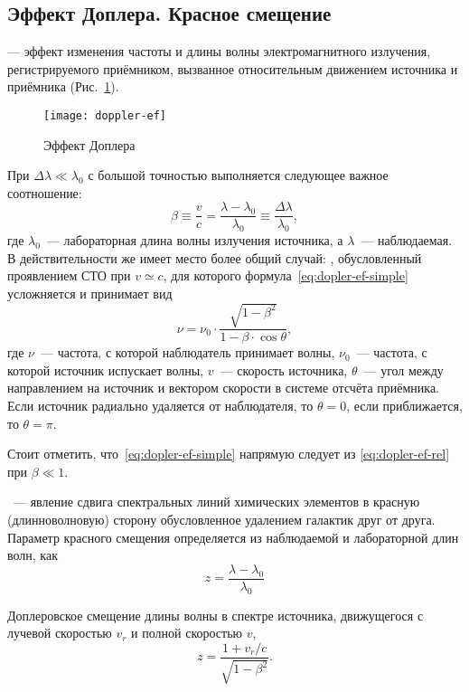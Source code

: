 \subsection{Эффект Доплера. Красное смещение} 
 --- эффект изменения частоты и длины волны электромагнитного излучения, регистрируемого приёмником, вызванное относительным движением источника и приёмника (Рис.~\ref{doppler-ef}).

\begin{figure}[h!]
	\centering
	\texttt{[image: doppler-ef]}
	\caption{Эффект Доплера}
	\label{doppler-ef}
\end{figure}

При $\Delta \lambda \ll \lambda_0$ с большой точностью выполняется следующее важное соотношение:\begin{equation}
	\beta \equiv \dfrac{v}{c} = \dfrac{\lambda - \lambda_0}{\lambda_0} \equiv \dfrac{\Delta \lambda}{\lambda_0},
	\label{eq:dopler-ef-simple}
\end{equation}
где $\lambda_0$~--- лабораторная длина волны излучения источника, а $\lambda$~--- наблюдаемая. 
В действительности же имеет место более общий случай: , обусловленный проявлением СТО при $v \simeq c$, для которого формула~\eqref{eq:dopler-ef-simple} усложняется и принимает вид \begin{equation}
	\nu = \nu_0 \cdot \dfrac{\sqrt{1 - \beta^2}}{1 - \beta \cdot \cos\theta},
	\label{eq:dopler-ef-rel}
\end{equation}
где $\nu$~--- частота, с которой наблюдатель принимает волны, $\nu_0$~--- частота, с которой источник испускает волны, $v$~--- скорость источника, $\theta$~--- угол между направлением на источник и вектором скорости в системе отсчёта приёмника. Если источник радиально удаляется от наблюдателя, то $\theta = 0$, если приближается, то $\theta =\pi$. 

Стоит отметить, что~\eqref{eq:dopler-ef-simple} напрямую следует из \eqref{eq:dopler-ef-rel} при $\beta  \ll 1$.

~--- явление сдвига спектральных линий химических элементов в красную (длинноволновую) сторону обусловленное удалением галактик друг от друга. Параметр красного смещения определяется из наблюдаемой и лабораторной длин волн, как
\begin{equation}
	z = \dfrac{\lambda - \lambda_0}{\lambda_0}
\end{equation}

Доплеровское смещение длины волны в спектре источника, движущегося с лучевой скоростью $v_{r}$ и полной скоростью $v$,
\begin{equation}
z = \dfrac{1 + v_r / c}{\sqrt{1 - \beta^2}}.
\end{equation}

